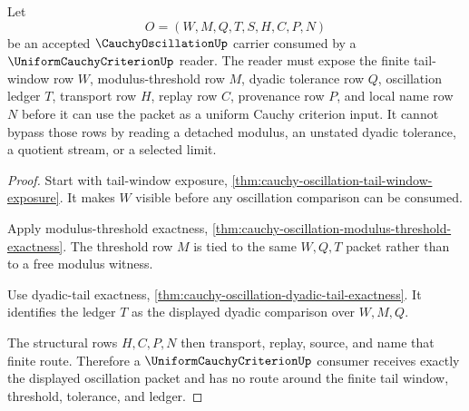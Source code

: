 \begin{theorem}
\label{thm:cauchy-oscillation-uniform-criterion-consumer}
Let
$$
O=(W,M,Q,T,S,H,C,P,N)
$$
be an accepted $\CauchyOscillationUp$ carrier consumed by a $\UniformCauchyCriterionUp$ reader. The reader must expose the finite tail-window row $W$, modulus-threshold row $M$, dyadic tolerance row $Q$, oscillation ledger $T$, transport row $H$, replay row $C$, provenance row $P$, and local name row $N$ before it can use the packet as a uniform Cauchy criterion input. It cannot bypass those rows by reading a detached modulus, an unstated dyadic tolerance, a quotient stream, or a selected limit.
\end{theorem}
\begin{proof}
Start with tail-window exposure, \autoref{thm:cauchy-oscillation-tail-window-exposure}. It makes $W$ visible before any oscillation comparison can be consumed.

Apply modulus-threshold exactness, \autoref{thm:cauchy-oscillation-modulus-threshold-exactness}. The threshold row $M$ is tied to the same $W,Q,T$ packet rather than to a free modulus witness.

Use dyadic-tail exactness, \autoref{thm:cauchy-oscillation-dyadic-tail-exactness}. It identifies the ledger $T$ as the displayed dyadic comparison over $W,M,Q$.

The structural rows $H,C,P,N$ then transport, replay, source, and name that finite route. Therefore a $\UniformCauchyCriterionUp$ consumer receives exactly the displayed oscillation packet and has no route around the finite tail window, threshold, tolerance, and ledger.
\end{proof}

